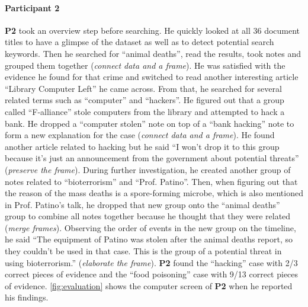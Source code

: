 \paragraph{Participant 2}
\textbf{P2} took an overview step before searching. He quickly looked at all 36 document titles to have a glimpse of the dataset as well as to detect potential search keywords. Then he searched for ``animal deaths'', read the results, took notes and grouped them together (\emph{connect data and a frame}). He was satisfied with the evidence he found for that crime and switched to read another interesting article ``Library Computer Left'' he came across. From that, he searched for several related terms such as ``computer'' and ``hackers''. He figured out that a group called ``F-alliance'' stole computers from the library and attempted to hack a bank. He dropped a ``computer stolen'' note on top of a ``bank hacking'' note to form a new explanation for the case (\emph{connect data and a frame}). He found another article related to hacking but he said ``I won't drop it to this group because it's just an announcement from the government about potential threats'' (\emph{preserve the frame}). During further investigation, he created another group of notes related to ``bioterrorism'' and ``Prof. Patino''. Then, when figuring out that the reason of the mass deaths is a spore-forming microbe, which is also mentioned in Prof. Patino's talk, he dropped that new group onto the ``animal deaths'' group to combine all notes together because he thought that they were related (\emph{merge frames}). Observing the order of events in the new group on the timeline, he said ``The equipment of Patino was stolen after the animal deaths report, so they couldn't be used in that case. This is the group of a potential threat in using bioterrorism.'' (\emph{elaborate the frame}). \textbf{P2} found the ``hacking'' case with 2/3 correct pieces of evidence and the ``food poisoning'' case with 9/13 correct pieces of evidence. \autoref{fig:evaluation} shows the computer screen of \textbf{P2} when he reported his findings.

